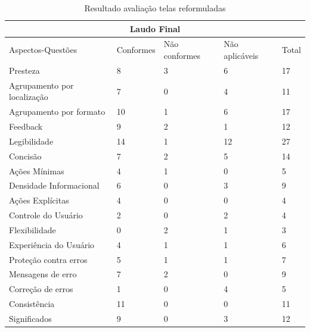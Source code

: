 \begin{table}[h]
\begin{tabular}{|l|l|l|l|l|}
\hline
\multicolumn{5}{|c|}{\textbf{Laudo Final}}                                       \\ \hline
Aspectos-Questões           & Conformes & Não conformes & Não aplicáveis & Total \\ \hline
Presteza                    & 8         & 3             & 6              & 17    \\ \hline
Agrupamento por localização & 7         & 0             & 4              & 11    \\ \hline
Agrupamento por formato     & 10        & 1             & 6              & 17    \\ \hline
Feedback                    & 9         & 2             & 1              & 12    \\ \hline
Legibilidade                & 14        & 1             & 12             & 27    \\ \hline
Concisão                    & 7         & 2             & 5              & 14    \\ \hline
Ações Mínimas               & 4         & 1             & 0              & 5     \\ \hline
Densidade Informacional     & 6         & 0             & 3              & 9     \\ \hline
Ações Explícitas            & 4         & 0             & 0              & 4     \\ \hline
Controle do Usuário         & 2         & 0             & 2              & 4     \\ \hline
Flexibilidade               & 0         & 2             & 1              & 3     \\ \hline
Experiência do Usuário      & 4         & 1             & 1              & 6     \\ \hline
Proteção contra erros       & 5         & 1             & 1              & 7     \\ \hline
Mensagens de erro           & 7         & 2             & 0              & 9     \\ \hline
Correção de erros           & 1         & 0             & 4              & 5     \\ \hline
Consistência                & 11        & 0             & 0              & 11    \\ \hline
Significados                & 9         & 0             & 3              & 12    \\ \hline
\end{tabular}
\caption{Resultado avaliação telas reformuladas}
\end{table}

